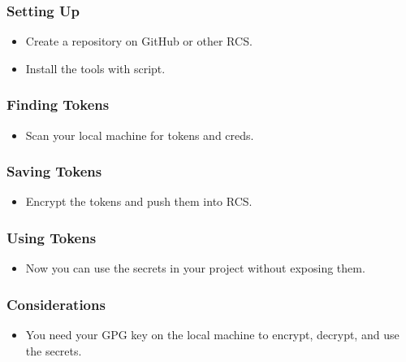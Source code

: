 \documentclass[aspectratio=169]{beamer}
\begin{document}
\begin{frame}
    \frametitle{Setting Up}
    \begin{itemize}
        \item Create a repository on GitHub or other RCS.
        \item Install the tools with script.
    \end{itemize}
\end{frame}

\begin{frame}
    \frametitle{Finding Tokens}
    \begin{itemize}
        \item Scan your local machine for tokens and creds.
    \end{itemize}
\end{frame}

\begin{frame}
    \frametitle{Saving Tokens}
    \begin{itemize}
        \item Encrypt the tokens and push them into RCS.
    \end{itemize}
\end{frame}

\begin{frame}
    \frametitle{Using Tokens}
    \begin{itemize}
        \item Now you can use the secrets in your project without exposing them.
    \end{itemize}
\end{frame}

\begin{frame}
    \frametitle{Considerations}
    \begin{itemize}
        \item You need your GPG key on the local machine to encrypt, decrypt, and use the secrets.
    \end{itemize}
\end{frame}
\end{document}
